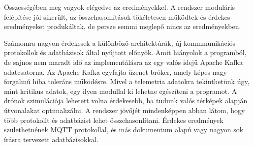 
Összességében meg vagyok elégedve az eredményekkel.
A rendszer moduláris felépítése jól sikerült, az összehasonlítások tökéletesen működtek és érdekes eredményeket produkáltak, de persze semmi meglepő nincs az eredményekben.
\par Számomra nagyon érdekesek a különböző architektúrák, új kommmunikációs protokollok és adatbázisok által nyújtott előnyök.
Amit hiányolok a programból, de sajnos nem maradt idő az implementálásra az egy valós idejű Apache Kafka adatcsatorna.
Az Apache Kafka egyfajta üzenet bróker, amely képes nagy forgalmú hiba toleráns működésre.
Mivel a telemetria adatokra tekinthetünk úgy, mint kritikus adatok, egy ilyen modullal ki lehetne egészíteni a programot.
A drónok szimulációja lehetett volna érdekesebb, ha tudunk valós térképek alapján útvonalakat optimalizálni.
A rendszer jövőjét mindenképpen abban látom, hogy több protokollt és adatbázist lehet összehasonlítani.
Érdekes eredmények születhetnének MQTT protokollal, és más dokumentum alapú vagy nagyon sok írásra tervezett adatbázisokkal.

